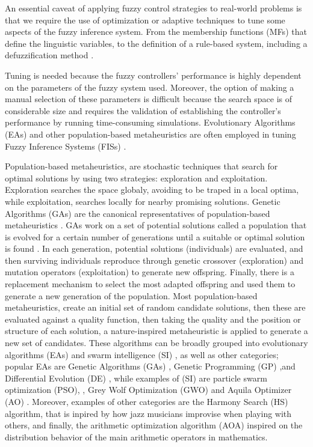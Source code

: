 \documentclass[symmetry,article,submit,moreauthors,pdftex]{Definitions/mdpi}
\begin{document}
An essential caveat of applying fuzzy control strategies to real-world problems
is that we require the use of optimization or adaptive techniques to tune some
aspects of the fuzzy inference system.  From the membership functions (MFs)
that define the linguistic variables, to the definition of a rule-based
system, including a defuzzification method
\cite{xia2019command,isaka1988design}. 

Tuning is needed because the fuzzy controllers' performance is highly dependent
on the parameters of the fuzzy system used. Moreover, the option of making a
manual selection of these parameters is difficult because the search space is
of considerable size and requires the validation of establishing the
controller's performance by running time-consuming simulations.  Evolutionary
Algorithms (EAs) and other population-based metaheuristics are often employed in tuning 
Fuzzy Inference Systems (FISs) %
\cite{martinez-soto_bio-inspired_2012,DBLP:conf/evoW/SalemMGG18}.

Population-based metaheuristics, are stochastic techniques that search for
optimal solutions by using two strategies: exploration and exploitation.
Exploration searches the space globaly, avoiding to be traped in a local
optima, while exploitation, searches locally for nearby promising solutions.
Genetic Algorithms (GAs) are the canonical representatives of population-based
metaheuristics \cite{holland1992genetic}.  GAs work on a set of potential
solutions called a population that is evolved for a certain number of
generations until a suitable or optimal solution is found
\cite{muelas_algoritmos_2009}.  In each generation, potential solutions
(individuals) are evaluated, and then surviving individuals reproduce through
genetic crossover (exploration) and mutation operators (exploitation) to
generate new offspring.  Finally, there is a replacement mechanism to select
the most adapted offspring and used them to generate a new generation of the
population.  Most population-based metaheuristics, create an initial set of
random candidate solutions, then these are evaluated against a quality
function, then taking the quality and the position or structure of each
solution, a nature-inspired metaheuristic is applied to generate a new set of
candidates.  These algorithms can be broadly grouped into evolutionary
algorithms (EAs) \cite{back1996evolutionary} and swarm intelligence (SI)
\cite{kennedy2006swarm}, as well as other categories; popular EAs are Genetic
Algorithms (GAs) \cite{holland1992adaptation,eiben2003genetic}, Genetic
Programming (GP) \cite{back1996evolutionary},and Differential Evolution (DE)
\cite{karabouga2004simple}, while examples of (SI) \cite{kennedy2006swarm} are
particle swarm optimization (PSO), \cite{clerc2010particle}, Grey Wolf
Optimization (GWO) \cite{mirjalili2014grey} and Aquila Optimizer (AO)
\cite{abualigah2021aquila}. Moreover, examples of other categories are the
Harmony Search (HS) \cite{geem2001new} algorithm, that is inpired by how jazz
musicians improvise when playing with others, and finally, the arithmetic
optimization algorithm (AOA) \cite{abualigah2021arithmetic} inspired on the
distribution behavior of the main arithmetic operators in mathematics.
\end{document}
